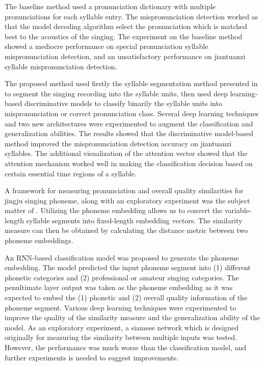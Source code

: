 The baseline method used a pronunciation dictionary with multiple pronunciations for each syllable entry. The mispronunciation detection worked as that the model decoding algorithm select the pronunciation which is matched best to the acoustics of the singing. The experiment on the baseline method showed a mediocre performance on special pronunciation syllable mispronunciation detection, and an unsatisfactory performance on \gls{jiantuanzi} syllable mispronunciation detection.

The proposed method used firstly the syllable segmentation method presented in  to segment the singing recording into the syllable units, then used deep learning-based discriminative models to classify binarily the syllable units into mispronunciation or correct pronunciation class. Several deep learning techniques and two new architectures were experimented to augment the classification and generalization abilities. The results showed that the discriminative model-based method improved the mispronunciation detection accuracy on \gls{jiantuanzi} syllables. The additional visualization of the attention vector showed that the attention mechanism worked well in making the classification decision based on certain essential time regions of a syllable.

A framework for measuring pronunciation and overall quality similarities for jingju singing phoneme, along with an exploratory experiment was the subject matter of . Utilizing the phoneme embedding allows us to convert the variable-length syllable segments into fixed-length embedding vectors. The similarity measure can then be obtained by calculating the distance metric between two phoneme embeddings. 

An \gls{RNN}-based classification model was proposed to generate the phoneme embedding. The model predicted the input phoneme segment into (1) different phonetic categories and (2) professional or amateur singing categories. The penultimate layer output was taken as the phoneme embedding as it was expected to embed the (1) phonetic and (2) overall quality information of the phoneme segment. Various deep learning techniques were experimented to improve the quality of the similarity measure and the generalization ability of the model. As an exploratory experiment, a siamese network which is designed originally for measuring the similarity between multiple inputs was tested. However, the performance was much worse than the classification model, and further experiments is needed to suggest improvements.


